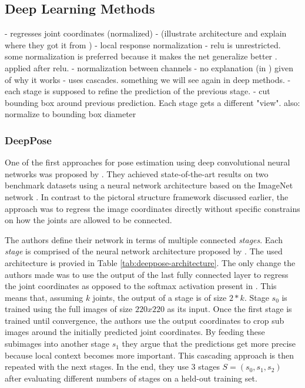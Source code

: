 \subsection{Deep Learning Methods}

- regresses joint coordinates (normalized)
- (illustrate architecture and explain where they got it from \cite{krizhevsky_imagenet_2012})
- local response normalization  
    - relu is unrestricted. some normalization is preferred because it makes the net generalize better \cite{krizhevsky_imagenet_2012}. applied after relu.
    - normalization between channels
    - no explanation (in \cite{krizhevsky_imagenet_2012}) given of why it works
- uses cascades. something we will see again in deep methods.
    - each stage is supposed to refine the prediction of the previous stage.
    - cut bounding box around previous prediction. Each stage gets a different "view". also: normalize to bounding box diameter

\subsubsection{DeepPose}
One of the first approaches for pose estimation using deep convolutional neural networks was proposed by \cite{toshev_deeppose:_2014}.
They achieved state-of-the-art results on two benchmark datasets using a neural network architecture based on the ImageNet network \cite{krizhevsky_imagenet_2012}.
In contrast to the pictoral structure framework discussed earlier, the approach was to regress the image coordinates directly without specific constrains on how the joints are allowed to be connected.

The authors define their network in terms of multiple connected \textit{stages}.
Each \textit{stage} is comprised of the neural network architecture proposed by \cite{krizhevsky_imagenet_2012}.
The used architecture is provied in Table \ref{tab:deeppose-architecture}.
The only change the authors made was to use the output of the last fully connected layer to regress the joint coordinates as opposed to the softmax activation present in \cite{krizhevsky_imagenet_2012}.
This means that, assuming $k$ joints, the output of a stage is of size $2 * k$.
Stage $s_0$ is trained using the full images of size $220 x 220$ as its input.
Once the first stage is trained until convergence, the authors use the output coordinates to crop sub images around the initially predicted joint coordinates.
By feeding these subimages into another stage $s_1$ they argue that the predictions get more precise because local context becomes more important.
This cascading approach is then repeated with the next stages.
In the end, they use $3$ stages $S = (s_0, s_1, s_2)$ after evaluating different numbers of stages on a held-out training set.

